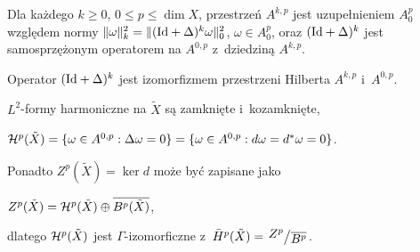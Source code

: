 \begin{stwierdzenie}[Atiyah]
	Dla każdego $k \geq 0$, $0 \leq p \leq \dim X$, przestrzeń
	$A^{k,p}$ jest uzupełnieniem $A_0^p$ względem normy
	${\|\omega \|_k^2} = {\| ({\mathrm{Id}}+\Delta)^k \omega \|_0^2}$,
	$\omega \in A_0^p$, oraz $({\mathrm{Id}}+\Delta)^k$ jest samosprzężonym
	operatorem na $A^{0,p}$ z~dziedziną $A^{k,p}$.
\end{stwierdzenie}

\begin{lemat}
	Operator $({\mathrm{Id}} + \Delta)^k$ jest izomorfizmem przestrzeni Hilberta
	$A^{k,p}$ i~$A^{0,p}$.
\end{lemat}

\begin{lemat}
	$L^2$-formy harmoniczne na $\tilde{X}$ są zamknięte
	i~kozamknięte,
	
	${\mathcal{H}}^p(\tilde{X}) = \{ \omega \in A^{0,p} : \Delta \omega = 0 \}
	= \{ \omega \in A^{0,p}: d \omega = d^\ast \omega = 0 \}$.
	
	Ponadto $Z^p(\tilde{X}) = \ker d$ może być zapisane jako
	
	$Z^p(\tilde{X}) = {\mathcal{H}}^p(\tilde{X}) \oplus 
	\overline{B^p(\tilde{X})}$,
	
	dlatego ${\mathcal{H}}^p(\tilde{X})$ jest $\Gamma$-izomorficzne
	z~$\bar{H}^p(\tilde{X}) = \bigslant{Z^p}{\overline{B^p}}$.
\end{lemat}












